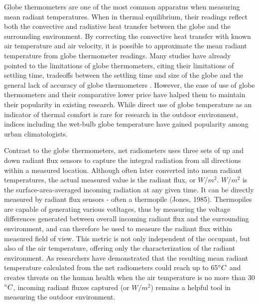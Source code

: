     Globe thermometers are one of the most common apparatus when measuring mean radiant temperatures. When in thermal equilibrium, their readings reflect both the convective and radiative heat transfer between the globe and the surrounding environment. By correcting the convective heat transfer with known air temperature and air velocity, it is possible to approximate the mean radiant temperature from globe thermometer readings\cite{standardization_iso7726_2001}. Many studies have already pointed to the limitations of globe thermometers, citing their limitations of settling time, tradeoffs between the settling time \cite{graves_globe_1974} and size of the globe \cite{dear_ping-pong_1988} and the general lack of accuracy of globe thermometers \cite{aparicio_globe_2016}. However, the ease of use of globe thermometers and their comparative lower price have halped them to maintain their popularity in existing research. While direct use of globe temperature as an indicator of thermal comfort is rare for research in the outdoor environment, indices including the wet-bulb globe temperature \cite{james_h._botsford_wet_1971} have gained popularity among urban climatologists. 

    Contrast to the globe thermometers, net radiometers uses three sets of up and down radiant flux sensors to capture the integral radiation from all directions within a measured location. Although often later converted into mean radiant temperatures, the actual measured value is the radiant flux, or $W/m^2$. 
    $W/m^2$ is the surface-area-averaged incoming radiation at any given time. It can be directly measured by radiant flux sensors - often a thermopile (Jones, 1985). Thermopiles are capable of generating various votltages, thus by measuring the voltage differences generated between overall incoming radiant flux and the surrounding environment, and can therefore be used to measure the radiant flux within measured field of view. This metric is not only independent of the occupant, but also of the air temperature, offering only the characterization of the radiant environment. As researchers have demonstrated that the resulting mean radiant temperature calculated from the net radiometers could reach up to 65$\degree C$ and creates threats on the human health when the air temperature is no more than 30 $\degree C$, incoming radiant fluxes captured (or $W/m^2$) remains a helpful tool in measuring the outdoor environment. 